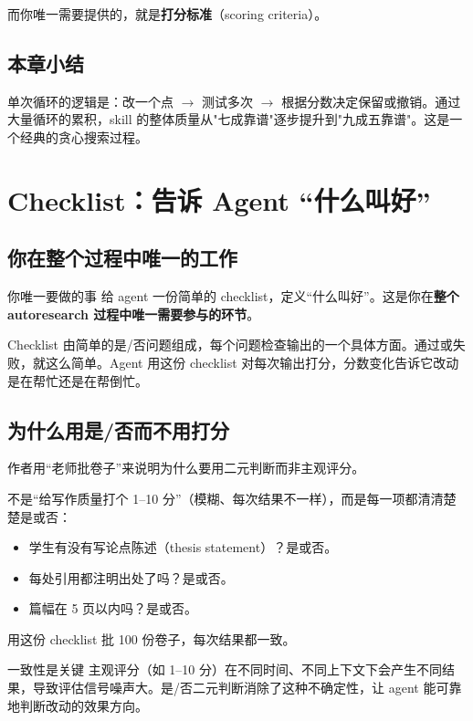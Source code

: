 \documentclass[a4paper]{article}
\begin{document}
而你唯一需要提供的，就是\textbf{打分标准}（scoring criteria）。

\subsection{本章小结}

单次循环的逻辑是：改一个点 $\to$ 测试多次 $\to$ 根据分数决定保留或撤销。通过大量循环的累积，skill 的整体质量从"七成靠谱"逐步提升到"九成五靠谱"。这是一个经典的贪心搜索过程。

\section{Checklist：告诉 Agent ``什么叫好''}

\subsection{你在整个过程中唯一的工作}

\begin{importantbox}{你唯一要做的事}
给 agent 一份简单的 checklist，定义``什么叫好''。这是你在\textbf{整个 autoresearch 过程中唯一需要参与的环节}。

Checklist 由简单的是/否问题组成，每个问题检查输出的一个具体方面。通过或失败，就这么简单。Agent 用这份 checklist 对每次输出打分，分数变化告诉它改动是在帮忙还是在帮倒忙。
\end{importantbox}

\subsection{为什么用是/否而不用打分}

作者用``老师批卷子''来说明为什么要用二元判断而非主观评分。

不是``给写作质量打个 1--10 分''（模糊、每次结果不一样），而是每一项都清清楚楚是或否：

\begin{itemize}
    \item 学生有没有写论点陈述（thesis statement）？是或否。
    \item 每处引用都注明出处了吗？是或否。
    \item 篇幅在 5 页以内吗？是或否。
\end{itemize}

用这份 checklist 批 100 份卷子，每次结果都一致。

\begin{knowledgebox}{一致性是关键}
主观评分（如 1--10 分）在不同时间、不同上下文下会产生不同结果，导致评估信号噪声大。是/否二元判断消除了这种不确定性，让 agent 能可靠地判断改动的效果方向。
\end{knowledgebox}
\end{document}
